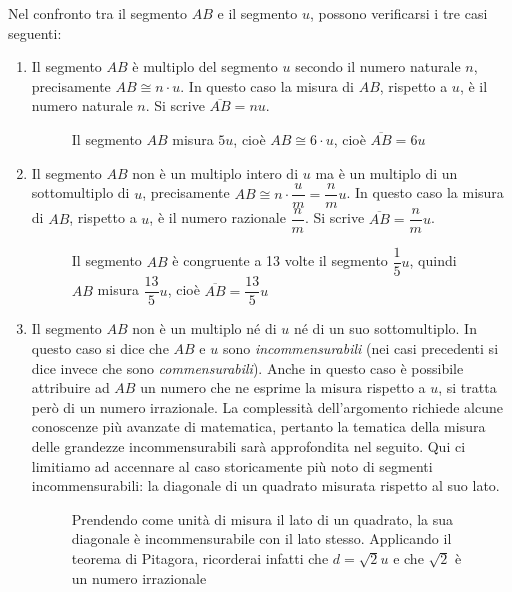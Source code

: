 Nel confronto tra il segmento $AB$ e il segmento $u$, possono verificarsi i tre casi seguenti:
\begin{enumerate}
\item Il segmento $AB$ è multiplo del segmento $u$ secondo il numero naturale $n$, precisamente $AB\cong n\cdot u$. In questo caso la misura di $AB$, rispetto a $u$, è il numero naturale $n$. Si scrive $\overline{AB} = nu$.

\begin{figure}[htb]
\centering
\caption{Il segmento $AB$ misura $5u$, cioè $AB\cong 6\cdot u$, cioè $\overline{AB}=6u$}
\end{figure}

\item Il segmento $AB$ non è un multiplo intero di $u$ ma è un multiplo di un sottomultiplo di $u$, precisamente $AB\cong n\cdot \dfrac{u}{m}=\dfrac{n}{m}u$. In questo caso la misura di $AB$, rispetto a $u$, è il numero razionale $\dfrac{n}{m}$. Si scrive $\overline{AB} = \dfrac{n}{m}u$.

\begin{figure}[htb]
\centering
\caption{Il segmento $AB$ è congruente a 13 volte il segmento $\dfrac{1}{5}u$, quindi $AB$ misura $\dfrac{13}{5}u$, cioè $\overline{AB}=\dfrac{13}{5}u$}
\end{figure}

\item Il segmento $AB$ non è un multiplo né di $u$ né di un suo sottomultiplo. In questo caso si dice che $AB$ e $u$ sono \emph{incommensurabili} (nei casi precedenti si dice invece che sono \emph{commensurabili}). Anche in questo caso è possibile attribuire ad $AB$ un numero che ne esprime la misura rispetto a $u$, si tratta però di un numero irrazionale. La complessità dell'argomento richiede alcune conoscenze più avanzate di matematica, pertanto la tematica della misura delle grandezze incommensurabili sarà approfondita nel seguito. Qui ci limitiamo ad accennare al caso storicamente più noto di segmenti incommensurabili: la diagonale di un quadrato misurata rispetto al suo lato.

\begin{figure}[htb]
\centering
\caption{Prendendo come unità di misura il lato di un quadrato, la sua diagonale è incommensurabile con il lato stesso. Applicando il teorema di Pitagora, ricorderai infatti che $d=\sqrt{2}u$ e che $\sqrt{2}$ è un numero irrazionale}
\end{figure}


\end{enumerate}
